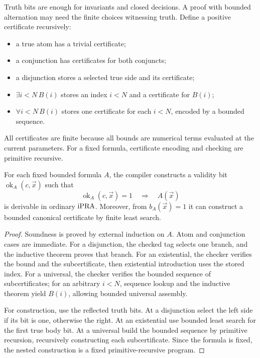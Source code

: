 Truth bits are enough for invariants and closed decisions.  A proof with
bounded alternation may need the finite choices witnessing truth.  Define a
positive certificate recursively:
\begin{itemize}
  \item a true atom has a trivial certificate;
  \item a conjunction has certificates for both conjuncts;
  \item a disjunction stores a selected true side and its certificate;
  \item \(\exists i<N\,B(i)\) stores an index \(i<N\) and a certificate for
        \(B(i)\);
  \item \(\forall i<N\,B(i)\) stores one certificate for each
        \(i<N\), encoded by a bounded sequence.
\end{itemize}
All certificates are finite because all bounds are numerical terms evaluated
at the current parameters.  For a fixed formula, certificate encoding and
checking are primitive recursive.

\begin{theorem}
\label{thm:strategy-sound}
For each fixed bounded formula \(A\), the compiler constructs a validity bit
\(\operatorname{ok}_A(c,\vec x)\) such that
\[
  \operatorname{ok}_A(c,\vec x)=1
  \quad\Longrightarrow\quad A(\vec x)
\]
is derivable in ordinary \(\mathrm{iPRA}\).  Moreover, from
\(b_A(\vec x)=1\) it can construct a bounded canonical certificate by finite
least search.
\end{theorem}

\begin{proof}
Soundness is proved by external induction on \(A\).  Atom and conjunction
cases are immediate.  For a disjunction, the checked tag selects one branch,
and the inductive theorem proves that branch.  For an existential, the checker
verifies the bound and the subcertificate, then existential introduction uses
the stored index.  For a universal, the checker verifies the bounded sequence
of subcertificates; for an arbitrary \(i<N\), sequence lookup and the
inductive theorem yield \(B(i)\), allowing bounded universal assembly.

For construction, use the reflected truth bits.  At a disjunction select the
left side if its bit is one, otherwise the right.  At an existential use
bounded least search for the first true body bit.  At a universal build the
bounded sequence by primitive recursion, recursively constructing each
subcertificate.  Since the formula is fixed, the nested construction is a
fixed primitive-recursive program.
\end{proof}

